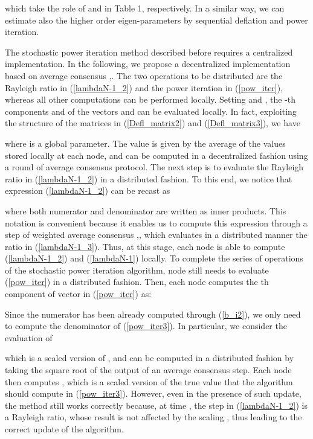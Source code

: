 \documentclass[10pt,twocolumn]{IEEEtran}
\begin{document}
which take the role of  and  in Table 1, respectively. In a similar way, we can estimate also the higher order eigen-parameters by sequential deflation and power iteration.


 The stochastic power iteration method described before requires a centralized implementation. In the following, we propose a decentralized implementation based on average consensus \cite{Olfati1},\cite{Barb-Scut}. The two operations to be distributed are the Rayleigh ratio in (\ref{lambdaN-1_2}) and the power iteration in (\ref{pow_iter}), whereas all other computations can be performed locally. 
Setting  and , the -th components  and  of the vectors  and  can be evaluated locally. In fact, exploiting the structure of the matrices in (\ref{Defl_matrix2}) and (\ref{Defl_matrix3}), we have

where  is a global parameter.
The value  is given by the average of the values  stored locally at each node, and can be computed in a decentralized fashion using a round of average consensus protocol. The next step is to evaluate the Rayleigh ratio in (\ref{lambdaN-1_2}) in a distributed fashion. To this end, we notice that expression (\ref{lambdaN-1_2}) can be recast as

where both numerator and denominator are written as inner products. This notation is convenient because it enables us to compute this expression through a step of weighted average consensus \cite{Olfati1},\cite{Barb-Scut}, which evaluates in a distributed manner the ratio in (\ref{lambdaN-1_3}). Thus, at this stage, each node is able to compute (\ref{lambdaN-1_2}) and (\ref{lambdaN-1}) locally.
To complete the series of operations of the stochastic power iteration algorithm, node  still needs  to evaluate (\ref{pow_iter}) in a distributed fashion. Then, each node  computes the th component of vector  in (\ref{pow_iter}) as:

Since the numerator has been already computed through (\ref{b_i2}), we only need to compute the denominator of (\ref{pow_iter3}). In particular, we consider the evaluation of

which is a scaled version of , and can be computed in a distributed fashion by taking the square root of the output of an average consensus step. Each node then computes ,
which is a scaled version of the true value  that the algorithm should compute in (\ref{pow_iter3}). However, even in the presence of such update, the method still works correctly because, at time , the step in (\ref{lambdaN-1_2}) is a Rayleigh ratio, whose result is not affected by the scaling , thus leading to the correct update of the algorithm.
\end{document}
